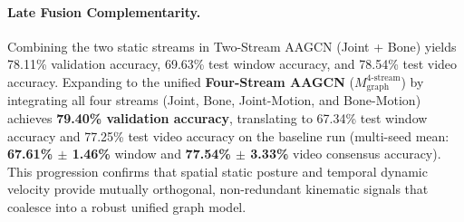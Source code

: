 \documentclass[runningheads]{llncs}
\begin{document}
\paragraph{Late Fusion Complementarity.} Combining the two static streams in Two-Stream AAGCN (Joint + Bone) yields 78.11\% validation accuracy, 69.63\% test window accuracy, and 78.54\% test video accuracy. Expanding to the unified \textbf{Four-Stream AAGCN} ($M_{\text{graph}}^{\text{4-stream}}$) by integrating all four streams (Joint, Bone, Joint-Motion, and Bone-Motion) achieves \textbf{79.40\% validation accuracy}, translating to 67.34\% test window accuracy and 77.25\% test video accuracy on the baseline run (multi-seed mean: \textbf{67.61\% $\pm$ 1.46\%} window and \textbf{77.54\% $\pm$ 3.33\%} video consensus accuracy). This progression confirms that spatial static posture and temporal dynamic velocity provide mutually orthogonal, non-redundant kinematic signals that coalesce into a robust unified graph model.

\begin{table}[!t]
\centering
\caption{Multi-stream spatial-temporal graph kinematic streams with SkelGym-Aug across validation and held-out test partitions.}
\label{tab:table4}
\end{table}
\end{document}

